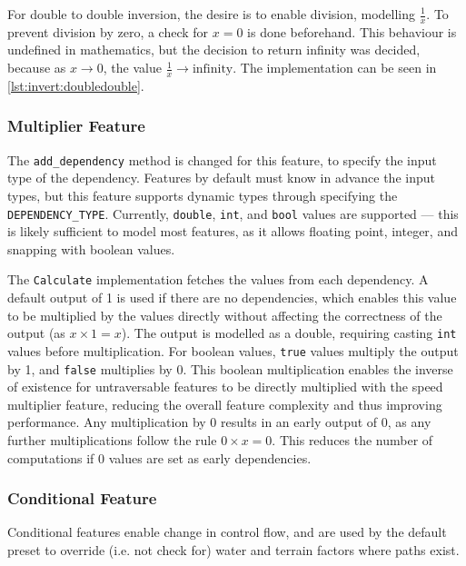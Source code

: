 \documentclass[12pt]{article}
\begin{document}
For double to double inversion, the desire is to enable division, modelling $\frac{1}{x}$. To prevent division by zero, a check for $x = 0$ is done beforehand. This behaviour is undefined in mathematics, but the decision to return infinity was decided, because as $x \rightarrow{} 0$, the value $\frac{1}{x} \rightarrow{} \text{infinity}$. The implementation can be seen in \autoref{lst:invert:doubledouble}.

\subsubsection{Multiplier Feature}

The \texttt{add\_dependency} method is changed for this feature, to specify the input type of the dependency. Features by default must know in advance the input types, but this feature supports dynamic types through specifying the \texttt{DEPENDENCY\_TYPE}. Currently, \texttt{double}, \texttt{int}, and \texttt{bool} values are supported --- this is likely sufficient to model most features, as it allows floating point, integer, and snapping with boolean values.

The \texttt{Calculate} implementation fetches the values from each dependency. A default output of 1 is used if there are no dependencies, which enables this value to be multiplied by the values directly without affecting the correctness of the output (as $x \times{1} = x$). The output is modelled as a double, requiring casting \texttt{int} values before multiplication. For boolean values, \texttt{true} values multiply the output by 1, and \texttt{false} multiplies by 0. This boolean multiplication enables the inverse of existence for untraversable features to be directly multiplied with the speed multiplier feature, reducing the overall feature complexity and thus improving performance. Any multiplication by 0 results in an early output of 0, as any further multiplications follow the rule $0 \times{x} = 0$. This reduces the number of computations if 0 values are set as early dependencies.

\subsubsection{Conditional Feature}

Conditional features enable change in control flow, and are used by the default preset to override (i.e. not check for) water and terrain factors where paths exist.
\end{document}
